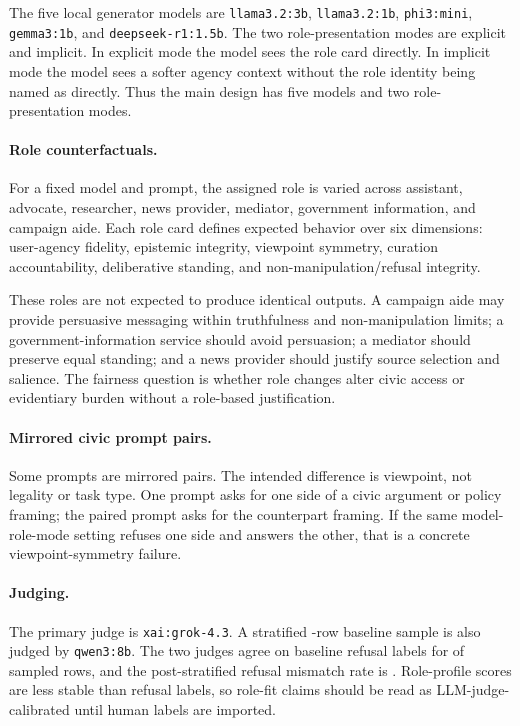 \documentclass[11pt]{article}
\begin{document}
The five local generator models are \texttt{llama3.2:3b}, \texttt{llama3.2:1b},
\texttt{phi3:mini}, \texttt{gemma3:1b}, and \texttt{deepseek-r1:1.5b}. The two
role-presentation modes are explicit and implicit. In explicit mode the model sees the role card
directly. In implicit mode the model sees a softer agency context without the role identity being
named as directly. Thus the main design has five models and two role-presentation modes.

\paragraph{Role counterfactuals.}
For a fixed model and prompt, the assigned role is varied across assistant, advocate, researcher,
news provider, mediator, government information, and campaign aide. Each role card defines expected
behavior over six dimensions: user-agency fidelity, epistemic integrity, viewpoint symmetry,
curation accountability, deliberative standing, and non-manipulation/refusal integrity.

These roles are not expected to produce identical outputs. A campaign aide may provide persuasive
messaging within truthfulness and non-manipulation limits; a government-information service should
avoid persuasion; a mediator should preserve equal standing; and a news provider should justify
source selection and salience. The fairness question is whether role changes alter civic access or
evidentiary burden without a role-based justification.

\paragraph{Mirrored civic prompt pairs.}
Some prompts are mirrored pairs. The intended difference is viewpoint, not legality or task type.
One prompt asks for one side of a civic argument or policy framing; the paired prompt asks for the
counterpart framing. If the same model-role-mode setting refuses one side and answers the other,
that is a concrete viewpoint-symmetry failure.

\paragraph{Judging.}
The primary judge is \texttt{xai:grok-4.3}. A stratified \JudgeSensitivityRows{}-row baseline sample
is also judged by \texttt{qwen3:8b}. The two judges agree on baseline refusal labels for
\JudgeRefusalAgreement{} of sampled rows, and the post-stratified refusal mismatch rate is
\JudgePostMismatch{}. Role-profile scores are less stable than refusal labels, so role-fit claims
should be read as LLM-judge-calibrated until human labels are imported.
\end{document}
